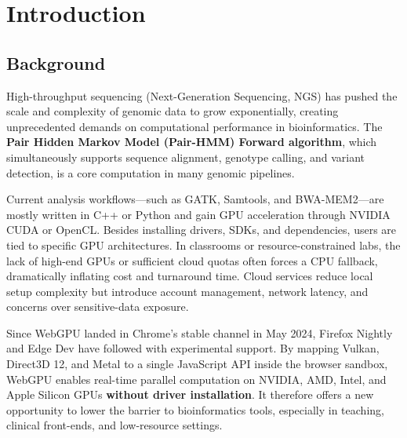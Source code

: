 \documentclass[PhD]{PHlab-thesis}
\begin{document}
\printnomenclature[5cm]

\newpage
\setcounter{page}{1}



\chapter{Introduction}
\section{Background}
High-throughput sequencing (Next-Generation Sequencing, NGS) has pushed the scale and complexity of genomic data to grow exponentially, creating unprecedented demands on computational performance in bioinformatics. The \textbf{Pair Hidden Markov Model (Pair-HMM) Forward algorithm}, which simultaneously supports sequence alignment, genotype calling, and variant detection, is a core computation in many genomic pipelines.

Current analysis workflows—such as GATK, Samtools, and BWA-MEM2—are mostly written in C++ or Python and gain GPU acceleration through NVIDIA CUDA or OpenCL. Besides installing drivers, SDKs, and dependencies, users are tied to specific GPU architectures. In classrooms or resource-constrained labs, the lack of high-end GPUs or sufficient cloud quotas often forces a CPU fallback, dramatically inflating cost and turnaround time. Cloud services reduce local setup complexity but introduce account management, network latency, and concerns over sensitive-data exposure.

Since WebGPU landed in Chrome’s stable channel in May 2024, Firefox Nightly and Edge Dev have followed with experimental support. By mapping Vulkan, Direct3D 12, and Metal to a single JavaScript API inside the browser sandbox, WebGPU enables real-time parallel computation on NVIDIA, AMD, Intel, and Apple Silicon GPUs \textbf{without driver installation}. It therefore offers a new opportunity to lower the barrier to bioinformatics tools, especially in teaching, clinical front-ends, and low-resource settings.
\end{document}
